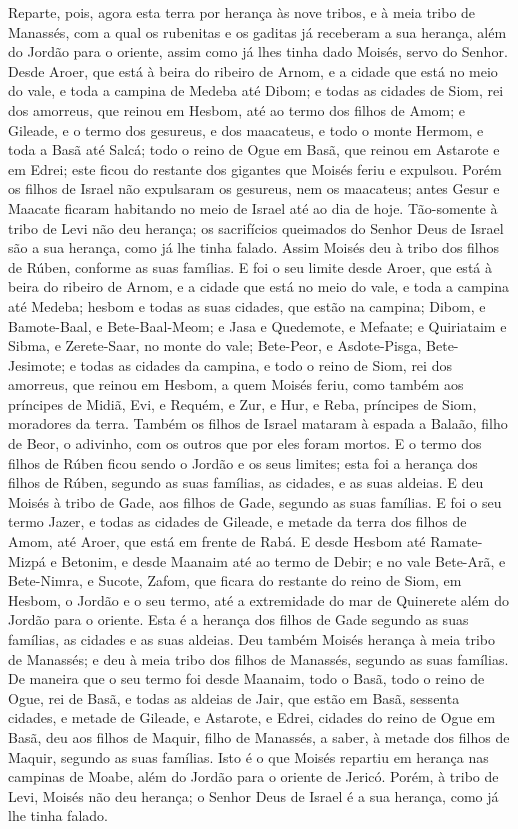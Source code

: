 Reparte, pois, agora esta terra por herança às nove tribos, e à
meia tribo de Manassés, com a qual os rubenitas e os gaditas já
receberam a sua herança, além do Jordão para o oriente, assim como
já lhes tinha dado Moisés, servo do Senhor. Desde Aroer, que
está à beira do ribeiro de Arnom, e a cidade que está no meio do
vale, e toda a campina de Medeba até Dibom; e todas as
cidades de Siom, rei dos amorreus, que reinou em Hesbom, até ao
termo dos filhos de Amom; e Gileade, e o termo dos gesureus,
e dos maacateus, e todo o monte Hermom, e toda a Basã até Salcá;
todo o reino de Ogue em Basã, que reinou em Astarote e em
Edrei; este ficou do restante dos gigantes que Moisés feriu e
expulsou. Porém os filhos de Israel não expulsaram os
gesureus, nem os maacateus; antes Gesur e Maacate ficaram habitando
no meio de Israel até ao dia de hoje. Tão-somente à tribo de
Levi não deu herança; os sacrifícios queimados do Senhor Deus de
Israel são a sua herança, como já lhe tinha falado. Assim
Moisés deu à tribo dos filhos de Rúben, conforme as suas famílias.
E foi o seu limite desde Aroer, que está à beira do ribeiro
de Arnom, e a cidade que está no meio do vale, e toda a campina até
Medeba; hesbom e todas as suas cidades, que estão na campina;
Dibom, e Bamote-Baal, e Bete-Baal-Meom; e Jasa e Quedemote, e
Mefaate; e Quiriataim e Sibma, e Zerete-Saar, no monte do
vale; Bete-Peor, e Asdote-Pisga, Bete-Jesimote; e
todas as cidades da campina, e todo o reino de Siom, rei dos
amorreus, que reinou em Hesbom, a quem Moisés feriu, como também aos
príncipes de Midiã, Evi, e Requém, e Zur, e Hur, e Reba, príncipes
de Siom, moradores da terra. Também os filhos de Israel
mataram à espada a Balaão, filho de Beor, o adivinho, com os outros
que por eles foram mortos. E o termo dos filhos de Rúben
ficou sendo o Jordão e os seus limites; esta foi a herança dos
filhos de Rúben, segundo as suas famílias, as cidades, e as suas
aldeias. E deu Moisés à tribo de Gade, aos filhos de Gade,
segundo as suas famílias. E foi o seu termo Jazer, e todas as
cidades de Gileade, e metade da terra dos filhos de Amom, até Aroer,
que está em frente de Rabá. E desde Hesbom até Ramate-Mizpá e
Betonim, e desde Maanaim até ao termo de Debir; e no vale
Bete-Arã, e Bete-Nimra, e Sucote, Zafom, que ficara do restante do
reino de Siom, em Hesbom, o Jordão e o seu termo, até a extremidade
do mar de Quinerete além do Jordão para o oriente. Esta é a
herança dos filhos de Gade segundo as suas famílias, as cidades e as
suas aldeias. Deu também Moisés herança à meia tribo de
Manassés; e deu à meia tribo dos filhos de Manassés, segundo as suas
famílias. De maneira que o seu termo foi desde Maanaim, todo
o Basã, todo o reino de Ogue, rei de Basã, e todas as aldeias de
Jair, que estão em Basã, sessenta cidades, e metade de
Gileade, e Astarote, e Edrei, cidades do reino de Ogue em Basã, deu
aos filhos de Maquir, filho de Manassés, a saber, à metade dos
filhos de Maquir, segundo as suas famílias. Isto é o que
Moisés repartiu em herança nas campinas de Moabe, além do Jordão
para o oriente de Jericó. Porém, à tribo de Levi, Moisés não
deu herança; o Senhor Deus de Israel é a sua herança, como já lhe
tinha falado.


